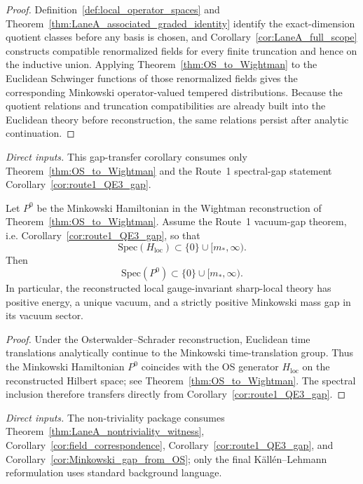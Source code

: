 \begin{proof}
Definition~\ref{def:local_operator_spaces} and Theorem~\ref{thm:LaneA_associated_graded_identity} identify the exact-dimension quotient classes before any basis is chosen, and Corollary~\ref{cor:LaneA_full_scope} constructs compatible renormalized fields for every finite truncation and hence on the inductive union.
Applying Theorem~\ref{thm:OS_to_Wightman} to the Euclidean Schwinger functions of those renormalized fields gives the corresponding Minkowski operator-valued tempered distributions.
Because the quotient relations and truncation compatibilities are already built into the Euclidean theory before reconstruction, the same relations persist after analytic continuation.
\end{proof}

\noindent\emph{Direct inputs.} This gap-transfer corollary consumes only Theorem~\ref{thm:OS_to_Wightman} and the Route~1 spectral-gap statement Corollary~\ref{cor:route1_QE3_gap}.\par

\begin{corollary}\label{cor:Minkowski_gap_from_OS}
Let $P^0$ be the Minkowski Hamiltonian in the Wightman reconstruction of Theorem~\ref{thm:OS_to_Wightman}.
Assume the Route~1 vacuum-gap theorem, i.e. Corollary~\ref{cor:route1_QE3_gap}, so that
\[
\mathrm{Spec}(H_{\mathrm{loc}})\subset \{0\}\cup[m_*,\infty).
\]
Then
\[
\mathrm{Spec}(P^0)\subset \{0\}\cup[m_*,\infty).
\]
In particular, the reconstructed local gauge-invariant sharp-local theory has positive energy, a unique vacuum, and a strictly positive Minkowski mass gap in its vacuum sector.
\end{corollary}

\begin{proof}
Under the Osterwalder--Schrader reconstruction, Euclidean time translations analytically continue to the Minkowski time-translation group.
Thus the Minkowski Hamiltonian $P^0$ coincides with the OS generator $H_{\mathrm{loc}}$ on the reconstructed Hilbert space; see Theorem~\ref{thm:OS_to_Wightman}.
The spectral inclusion therefore transfers directly from Corollary~\ref{cor:route1_QE3_gap}.
\end{proof}


\noindent\emph{Direct inputs.} The non-triviality package consumes Theorem~\ref{thm:LaneA_nontriviality_witness}, Corollary~\ref{cor:field_correspondence}, Corollary~\ref{cor:route1_QE3_gap}, and Corollary~\ref{cor:Minkowski_gap_from_OS}; only the final K\"all\'en--Lehmann reformulation uses standard background language.\par

